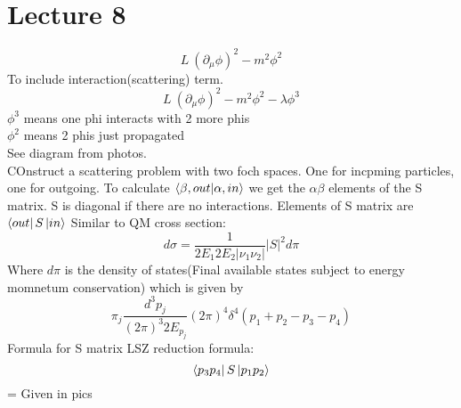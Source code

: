 \documentclass{scrartcl}
\begin{document}
\section{Lecture 8}
\[ L ~ (\partial_\mu \phi)^2 - m^2 \phi^2 \]
To include interaction(scattering) term.
\[  L ~ (\partial_\mu \phi)^2 - m^2 \phi^2 - \lambda \phi^3  \]
\( \phi^3  \) means one phi interacts with 2 more phis\\
\( \phi^2  \) means 2 phis just propagated\\
See diagram from photos.\\
COnstruct a scattering problem with two foch spaces. One for incpming particles, one for outgoing.
To calculate \( \bra{\beta, out} \ket{\alpha, in} \) we get the \( \alpha \beta  \) elements of the S matrix.
S is diagonal if there are no interactions.
Elements of S matrix are \( \bra{out} S \ket{in} \)
Similar to QM cross section:
\[ d \sigma = \displaystyle\frac{1}{2E_1 2E_2 |\nu_1 \nu_2 |} |S|^2 d\pi\] 
Where \( d \pi \) is the density of states(Final available states subject to energy momnetum conservation) which is given by
\[ \pi_j \displaystyle\frac{d^3 p_j}{(2\pi)^3 2 E_{p_j}} (2 \pi)^4 \delta^4 (p_1 + p_2 - p_3 - p_4) \]
Formula for S matrix LSZ reduction formula:
\[ \bra{p_3 p_4} S \ket{p_1 p_2} \]  =  Given in pics
\end{document}

